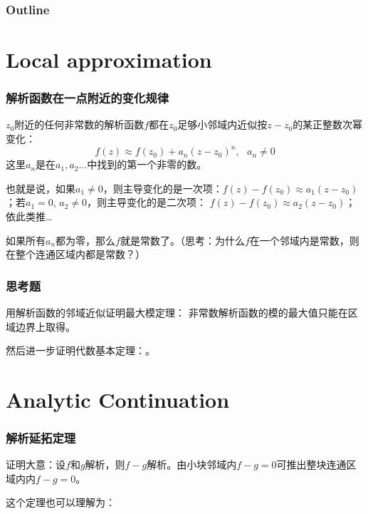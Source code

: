 \documentclass[CJK, 13pt]{beamer}
\date{}
\begin{document}
  \bch
{}

\begin{frame}
\frametitle{Outline}
\tableofcontents
\end{frame}


\section{Local approximation}

\begin{frame}
  \frametitle{解析函数在一点附近的变化规律}
  
  
  {\blue $z_0$附近的任何非常数的解析函数$f$都在$z_0$足够小邻域内近似按$z-z_0$的某正整数次幂变化：
  $$f(z)\approx f(z_0) + a_n(z-z_0)^n ,\ \ \  a_n\ne 0$$
  这里$a_n$是在$a_1,a_2\ldots$中找到的第一个非零的数。}


  \skiplines
  
  也就是说，如果$a_1\ne 0$，则主导变化的是一次项：$f(z)- f(z_0) \approx a_1(z-z_0)$；若$a_1 = 0$, $a_2\ne 0$，则主导变化的是二次项：  $f(z)-f(z_0) \approx a_2(z-z_0)$；依此类推…

  \skiplines

  如果所有$a_n$都为零，那么$f$就是常数了。（思考：为什么$f$在一个邻域内是常数，则在整个连通区域内都是常数？）
  
\end{frame}


\begin{frame}
  \frametitle{思考题}

  用解析函数的邻域近似证明最大模定理： {\blue 非常数解析函数的模的最大值只能在区域边界上取得。}

  \skipline
  然后进一步证明代数基本定理：{。}
\end{frame}


\section{Analytic Continuation}

\begin{frame}
  \frametitle{解析延拓定理}
  
  

  证明大意：设$f$和$g$解析，则$f-g$解析。由小块邻域内$f-g=0$可推出整块连通区域内内$f-g=0$。

  \skiplines

  这个定理也可以理解为：
  
  
\end{frame}
\end{document}
